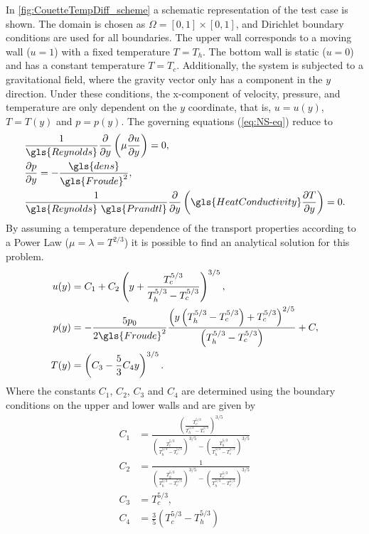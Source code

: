 In \cref{fig:CouetteTempDiff_scheme} a schematic representation of the test case is shown. The domain is chosen as $\Omega = [0,1]\times[0,1]$, and Dirichlet boundary conditions are used for all boundaries. The upper wall corresponds to a moving wall ($u = 1$) with a fixed temperature $T=T_h$. The bottom wall is static ($u = 0$) and has a constant temperature $T = T_c$.
Additionally, the system is subjected to a gravitational field, where the gravity vector only has a component in the $y$ direction. Under these conditions, the x-component of velocity, pressure, and temperature are only dependent on the $y$ coordinate, that is, $u = u(y)$, $T = T(y)$ and $p = p(y)$. The governing equations (\cref{eq:NS-eq}) reduce to%
\begin{subequations}
    \begin{align}
    	 & \frac{1}{\gls{Reynolds}} \pfrac{ }{y}\left(\mu\pfrac{u}{y}\right) = 0,\\
    	 & \pfrac{p}{y} = -\frac{\gls{dens}}{\gls{Froude}^2},\\
    	 & \frac{1}{\gls{Reynolds}~\gls{Prandtl}} \pfrac{ }{y}\left(\gls{HeatConductivity}\pfrac{T}{y}\right) = 0.
    \end{align}\label{eq:AllCouetteEquations}
\end{subequations}
By assuming a temperature dependence of the transport properties according to a Power Law ($\mu = \lambda = T^{2/3}$) it is possible to find an analytical solution for this problem.
\begingroup
\allowdisplaybreaks
\begin{subequations}
    \begin{align}
    	u(y) & = C_1 + C_2\left(y + \frac{T_c^{5/3}}{T_h^{5/3}-T_c^{5/3}} \right)^{3/5},\\
    	p(y) & = -\frac{5p_0}{2\gls{Froude}^2}\frac{\left(y\left(T_h^{5/3}-T_c^{5/3}\right)+T_c^{5/3}\right)^{2/5}}{\left(T_h^{5/3}-T_c^{5/3}\right)}+C,\\
    	T(y) & = \left(C_3 - \frac{5}{3}C_4 y\right)^{3/5}.
    \end{align}\label{eq:AllCouetteSolutions}
\end{subequations}
\endgroup
Where the constants $C_1$, $C_2$, $C_3$ and $C_4$ are determined using the boundary conditions on the upper and lower walls and are given by
\begin{subequations}
\begin{align}
	C_1 & = \frac{\left(\frac{T_c^{5/3}}{T_h^{5/3}-T_c^{5/3}}\right)^{3/5}}{\left(\frac{T_c^{5/3}}{T_h^{5/3}-T_c^{5/3}}\right)^{3/5}-\left(\frac{T_h^{5/3}}{T_h^{5/3}-T_c^{5/3}}\right)^{3/5}} \\
	C_2 & = \frac{1}{\left(\frac{T_h^{5/3}}{T_h^{5/3}-T_c^{5/3}}\right)^{3/5}-\left(\frac{T_c^{5/3}}{T_h^{5/3}-T_c^{5/3}}\right)^{3/5}}                                                        \\
	C_3 & = T_c^{5/3},                                                                                                                                                                         \\
	C_4 & = \frac{3}{5}\left(T_c^{5/3}-T_h^{5/3}\right)
\end{align}
\end{subequations}
